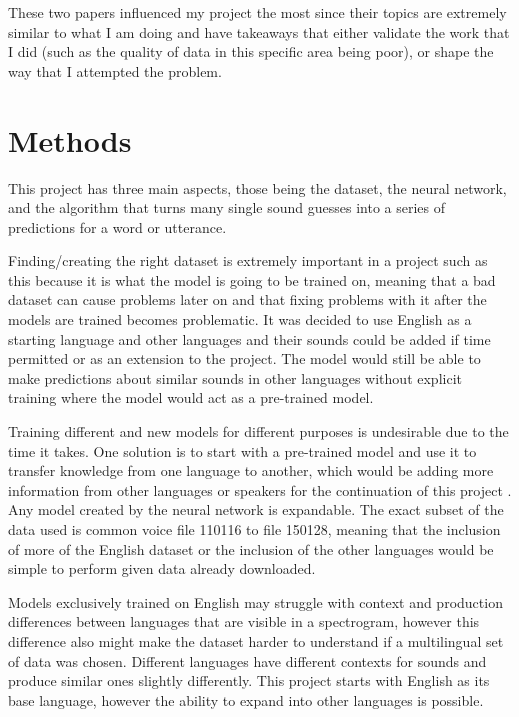 \documentclass[10pt,twocolumn]{article}
\begin{document}
These two papers influenced my project the most since their topics are extremely similar to what I am doing and have takeaways that either validate the work that I did (such as the quality of data in this specific area being poor), or shape the way that I attempted the problem. 


\section{Methods}

This project has three main aspects, those being the dataset, the neural network, and the algorithm that turns many single sound guesses into a series of predictions for a word or utterance. 


Finding/creating the right dataset is extremely important in a project such as this because it is what the model is going to be trained on, meaning that a bad dataset can cause problems later on and that fixing problems with it after the models are trained becomes problematic. It was decided to use English as a starting language and other languages and their sounds could be added if time permitted or as an extension to the project. The model would still be able to make predictions about similar sounds in other languages without explicit training where the model would act as a pre-trained model. 

Training different and new models for different purposes is undesirable due to the time it takes. One solution is to start with a pre-trained model and use it to transfer knowledge from one language to another, which would be adding more information from other languages or speakers for the continuation of this project \cite{PreTrained}. Any model created by the neural network is expandable. The exact subset of the data used is common voice file 110116 to file 150128, meaning that the inclusion of more of the English dataset or the inclusion of the other languages would be simple to perform given data already downloaded. 



	
Models exclusively trained on English may struggle with context and production differences between languages that are visible in a spectrogram, however this difference also might make the dataset harder to understand if a multilingual set of data was chosen. Different languages have different contexts for sounds and produce similar ones slightly differently. This project starts with English as its base language, however the ability to expand into other languages is possible.
\end{document}
